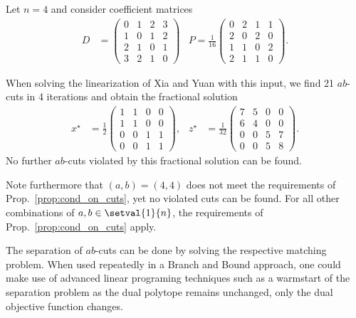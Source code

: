 \begin{example}
\label{example:no_integral_sol_with_cuts}
	Let $n=4$ and consider coefficient matrices
	\begin{align*}
		D &=
		\begin{pmatrix}
			0&1&2&3\\
			1&0&1&2\\
			2&1&0&1\\
			3&2&1&0
		\end{pmatrix}&
		P = \frac{1}{16}
		\begin{pmatrix}
			0&2&1&1\\
			2&0&2&0\\
			1&1&0&2\\
			2&1&1&0
		\end{pmatrix}.
	\end{align*}
	
	When solving the linearization of Xia and Yuan with this input, we find 21 $ab$-cuts in 4 iterations and obtain the fractional solution
	\begin{align*}
		x^\star &= \frac{1}{2}
		\begin{pmatrix}
			1&1&0&0\\
			1&1&0&0\\
			0&0&1&1\\
			0&0&1&1
		\end{pmatrix},&
		z^\star&=\frac{1}{32}
		\begin {pmatrix}
			7&5&0&0\\
			6&4&0&0\\
			0&0&5&7\\
			0&0&5&8
		\end{pmatrix}.
	\end{align*}
	No further $ab$-cuts violated by this fractional solution can be found.
	
	Note furthermore that $(a,b) = (4,4)$ does not meet the requirements of Prop.~\ref{prop:cond_on_cuts}, yet no violated cuts can be found. For all other combinations of $a,b \in\setval{1}{n}$, the requirements of Prop.~\ref{prop:cond_on_cuts} apply.
\end{example}

The separation of $ab$-cuts can be done by solving the respective matching problem. When used repeatedly in a Branch and Bound approach, one could make use of advanced linear programing techniques such as a warmstart of the separation problem as the dual polytope remains unchanged, only the dual objective function changes.

